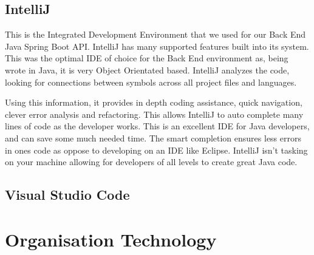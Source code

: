 \subsection{IntelliJ}
This is the Integrated Development Environment that we used for our Back End Java Spring Boot API. IntelliJ has many supported features built into its system. This was the optimal IDE of choice for the Back End environment as, being wrote in Java, it is very Object Orientated based. IntelliJ analyzes the code, looking for connections between symbols across all project files and languages.\par
Using this information, it provides in depth coding assistance, quick navigation, clever error analysis and refactoring. This allows IntelliJ to auto complete many lines of code as the developer works. This is an excellent IDE for Java developers, and can save some much needed time. The smart completion ensures less errors in ones code as oppose to developing on an IDE like Eclipse. IntelliJ isn't tasking on your machine allowing for developers of all levels to create great Java code.

\subsection{Visual Studio Code}

\section{Organisation Technology}

